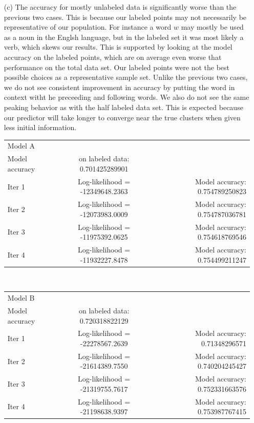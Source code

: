 \documentclass{article}
\begin{document}
\begin{enumerate}
\begin{enumerate}
		\item[(c)]
		The accuracy for mostly unlabeled data is significantly worse than the previous two cases. This is because our labeled points may not necessarily be representative of our population. For instance a word $w$ may mostly be used as a noun in the Englsh language, but in the labeled set it was most likely a verb, which skews our results. This is supported by looking at the model accuracy on the labeled points, which are on average even worse that performance on the total data set. Our labeled points were not the best possible choices as a representative sample set. Unlike the previous two cases, we do not see consistent improvement in accuracy by putting the word in context witht he preceeding and following words. We also do not see the same peaking behavior as with the half labeled data set. This is expected because our predictor will take longer to converge near the true clusters when given less initial information. \\
		
\begin{tabular}{ l c r }
Model A & &\\
Model accuracy & on labeled data: 0.701425289901 &\\
Iter 1 & Log-likelihood = -12349648.2363 & Model accuracy: 0.754789250823\\
Iter 2 & Log-likelihood = -12073983.0009 & Model accuracy: 0.754787036781\\
Iter 3 & Log-likelihood = -11975392.0625 & Model accuracy: 0.754618769546\\
Iter 4 & Log-likelihood = -11932227.8478 & Model accuracy: 0.754499211247\\
\end{tabular}\\

\begin{tabular}{ l c r }
Model B & &\\
Model accuracy & on labeled data: 0.720318822129&\\
Iter 1 & Log-likelihood = -22278567.2639 & Model accuracy: 0.71348296571\\
Iter 2 & Log-likelihood = -21614389.7550 & Model accuracy: 0.740204245427\\
Iter 3 & Log-likelihood = -21319755.7617 & Model accuracy: 0.752331663576\\
Iter 4 & Log-likelihood = -21198638.9397 & Model accuracy: 0.753987767415\\
\end{tabular}\\


\end{enumerate}
\end{enumerate}
\end{document}
